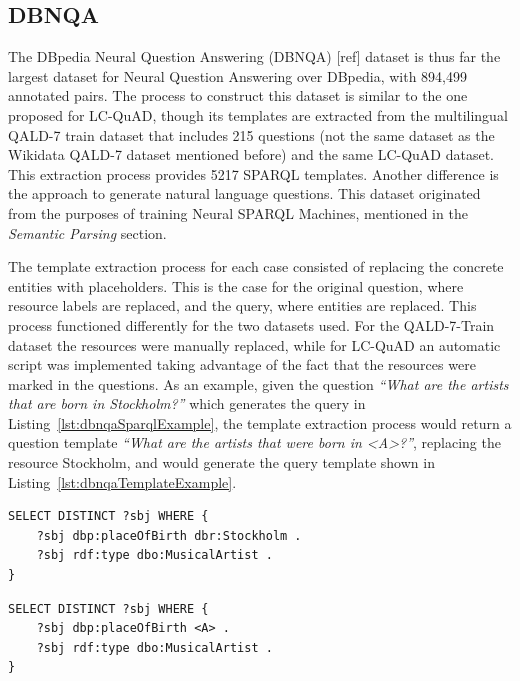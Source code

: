 \subsection{DBNQA}
The DBpedia Neural Question Answering (DBNQA) [ref] dataset is thus far the largest dataset for 
Neural Question Answering over DBpedia, with 894,499 annotated pairs. The process to construct 
this dataset is similar to the one proposed for LC-QuAD, though its templates are extracted 
from the multilingual QALD-7 train dataset that includes 215 questions (not the same dataset as 
the Wikidata QALD-7 dataset mentioned before) and the same LC-QuAD dataset. This extraction 
process provides 5217 SPARQL templates. Another difference is the approach to generate natural 
language questions. This dataset originated from the purposes of training Neural SPARQL 
Machines, mentioned in the \textit{Semantic Parsing} section.

The template extraction process for each case consisted of replacing the concrete entities 
with placeholders. This is the case for the original question, where resource labels are 
replaced, and the query, where entities are replaced. This process functioned differently for 
the two datasets used. For the QALD-7-Train~\cite{dataset:qald7-UsbeckNHKRN17} dataset the 
resources were manually replaced, while for LC-QuAD an automatic script was implemented taking 
advantage of the fact that the resources were marked in the questions. As an example, given the 
question \textit{“What are the artists that are born in Stockholm?”} which generates the query 
in Listing~\ref{lst:dbnqaSparqlExample}, the template extraction process would return a 
question template \textit{“What are the artists that were born in <A>?”}, replacing the 
resource Stockholm, and would generate the query template shown in Listing~\ref{lst:dbnqaTemplateExample}.

\begin{lstlisting}[captionpos=b, 
    caption=SPARQL query for the question: \textit{"What are the artists that are born in Stockholm?"}., 
    label=lst:dbnqaSparqlExample,
    basicstyle=\ttfamily,frame=single]
SELECT DISTINCT ?sbj WHERE {
    ?sbj dbp:placeOfBirth dbr:Stockholm .
    ?sbj rdf:type dbo:MusicalArtist .
}
\end{lstlisting}


\begin{lstlisting}[captionpos=b, 
    caption=Query template for the question: \textit{"What are the artists that are born in <A>?"}., 
    label=lst:dbnqaTemplateExample,
    basicstyle=\ttfamily,frame=single]
SELECT DISTINCT ?sbj WHERE {
    ?sbj dbp:placeOfBirth <A> .
    ?sbj rdf:type dbo:MusicalArtist .
}
\end{lstlisting}


